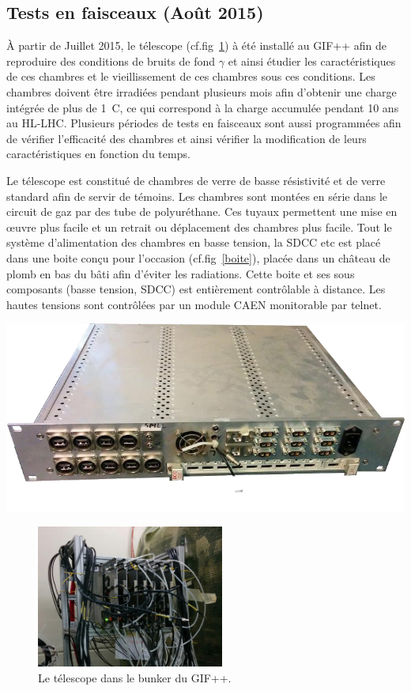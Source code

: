 \subsection{Tests en faisceaux (Août 2015)}
À partir de Juillet 2015, le télescope (cf.fig~\ref{GIFppChambers}) à été installé au GIF++ afin de reproduire des conditions de bruits de fond $\gamma$ et ainsi étudier les caractéristiques de ces chambres et le vieillissement de ces chambres sous ces conditions. Les chambres doivent être irradiées pendant plusieurs mois afin d'obtenir une charge intégrée de plus de \SI{1}{\coulomb}, ce qui correspond à la charge accumulée pendant \num{10} ans au HL-LHC.
Plusieurs périodes de tests en faisceaux sont aussi programmées afin de vérifier l'efficacité des chambres et ainsi vérifier la modification de leurs caractéristiques en fonction du temps.

Le télescope est constitué de chambres de verre de basse résistivité et de verre standard afin de servir de témoins. Les chambres sont montées en série dans le circuit de gaz par des tube de polyuréthane. Ces tuyaux permettent une mise en œuvre plus facile et un retrait ou déplacement des chambres plus facile. Tout le système d'alimentation des chambres en basse tension, la SDCC etc est placé dans une boite conçu pour l'occasion (cf.fig~\ref{boite}), placée dans un château de plomb en bas du bâti afin d'éviter les radiations. Cette boite et ses sous composants (basse tension, SDCC) est entièrement contrôlable à distance. Les hautes tensions sont contrôlées par un module CAEN monitorable par telnet.

\marginpar
{
	\centering
	\includegraphics[width=1.0\marginparwidth]{GLA/boite.png}
	\label{boite}
}

\begin{figure}[!ht]
	\centering
	\includegraphics[width=0.55\textwidth]{GLA/GIFppChambers.png}
	\caption{Le télescope dans le bunker du GIF++.}
	\label{GIFppChambers}
\end{figure}

